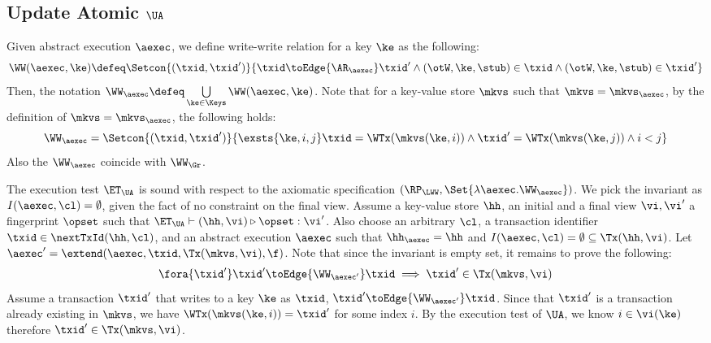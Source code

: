 \subsection{Update Atomic \( \UA \)}
\label{sec:sound-complete-ua}

Given abstract execution \( \aexec \), we define write-write relation for a key \( \ke \) as the following:
\[ 
    \WW(\aexec,\ke) \defeq \Setcon{(\txid, \txid')}{\txid \toEdge{\AR_\aexec} \txid' \land (\otW,\ke, \stub ) \in \txid \land (\otW,\ke, \stub ) \in \txid'  } 
\]
Then, the notation \( \WW_\aexec \defeq \bigcup\limits_{\ke \in \Keys} \WW(\aexec, \ke) \).
Note that for a key-value store \( \mkvs \) such that \( \mkvs = \mkvs_\aexec \),
by the definition of  \(  \mkvs = \mkvs_\aexec \), 
the following holds:
\[
    \WW_\aexec = \Setcon{(\txid, \txid')}{\exsts{\ke, i,j } \txid = \WTx(\mkvs(\ke, i)) \land \txid' = \WTx(\mkvs(\ke, j)) \land i < j}
\]
Also the \( \WW_\aexec \) coincide with \( \WW_\Gr \).

The execution test $\ET_\UA$ is sound with respect to the axiomatic specification \( (\RP_{\LWW}, \Set{\lambda \aexec. \WW_\aexec }) \).
We pick the invariant as \( I( \aexec, \cl ) = \emptyset \), given the fact of no constraint on the final view.
Assume a key-value store $\hh$, an initial and a final view $\vi, \vi'$  a fingerprint $\opset$ 
such that $\ET_{\UA} \vdash (\hh, \vi) \triangleright \opset: \vi'$. 
Also choose an arbitrary $\cl$, a transaction identifier $\txid \in \nextTxId(\hh, \cl)$, 
and an abstract execution $\aexec$ such that $\hh_{\aexec} = \hh$ and 
\( I(\aexec, \cl) =  \emptyset \subseteq \Tx(\hh, \vi) \).
Let \( \aexec' = \extend(\aexec, \txid, \Tx(\mkvs, \vi), \f ) \).
Note that since the invariant is empty set, it remains to prove the following:
\[
    \begin{array}{@{}l@{}}
        \fora{ \txid' } \txid' \toEdge{\WW_{\aexec'}} \txid \implies \txid' \in \Tx(\mkvs, \vi)
    \end{array}
\]
Assume a transaction \( \txid' \) that writes to a key \( \ke \) as \( \txid \), \ie \( \txid' \toEdge{\WW_{\aexec'}} \txid \).
Since that \( \txid' \) is a transaction already existing in \( \mkvs\),
we have \( \WTx(\mkvs(\ke, i)) = \txid' \) for some index \( i \).
By the execution test of \( \UA \), we know \( i \in \vi(\ke) \) therefore \( \txid' \in \Tx(\mkvs, \vi) \).


